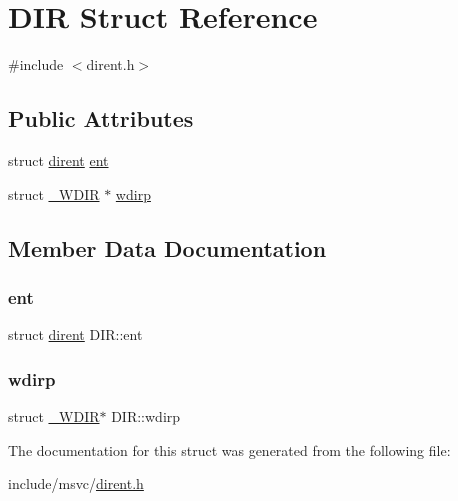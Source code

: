 \hypertarget{struct_d_i_r}{}\section{D\+IR Struct Reference}
\label{struct_d_i_r}


{\ttfamily \#include $<$dirent.\+h$>$}

\subsection*{Public Attributes}
\begin{DoxyCompactItemize}
\item 
struct \mbox{\hyperlink{structdirent}{dirent}} \mbox{\hyperlink{struct_d_i_r_a59e9f5211cbb2f8e5b2807ccfdd2a7fc}{ent}}
\item 
struct \mbox{\hyperlink{struct___w_d_i_r}{\+\_\+\+W\+D\+IR}} $\ast$ \mbox{\hyperlink{struct_d_i_r_a29362d4a3d7f809d0f5418b26cac5d41}{wdirp}}
\end{DoxyCompactItemize}


\subsection{Member Data Documentation}
\mbox{\label{struct_d_i_r_a59e9f5211cbb2f8e5b2807ccfdd2a7fc}} 
\subsubsection{\texorpdfstring{ent}{ent}}
{\footnotesize\ttfamily struct \mbox{\hyperlink{structdirent}{dirent}} D\+I\+R\+::ent}

\mbox{\label{struct_d_i_r_a29362d4a3d7f809d0f5418b26cac5d41}} 
\subsubsection{\texorpdfstring{wdirp}{wdirp}}
{\footnotesize\ttfamily struct \mbox{\hyperlink{struct___w_d_i_r}{\+\_\+\+W\+D\+IR}}$\ast$ D\+I\+R\+::wdirp}



The documentation for this struct was generated from the following file\+:\begin{DoxyCompactItemize}
\item 
include/msvc/\mbox{\hyperlink{dirent_8h}{dirent.\+h}}\end{DoxyCompactItemize}
